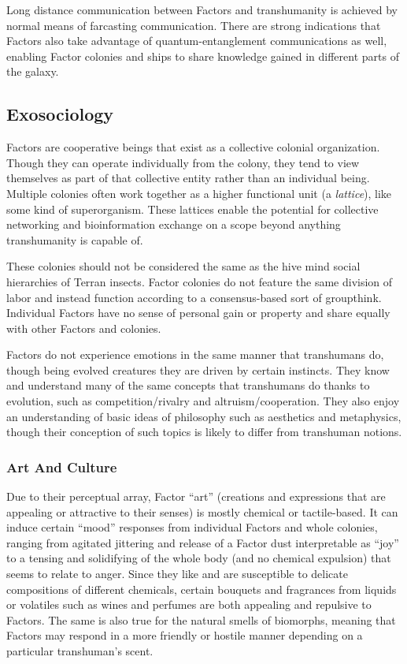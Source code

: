 Long distance communication between Factors and transhumanity is achieved by normal means of farcasting communication. There are strong indications that Factors also take advantage of quantum-entanglement communications as well, enabling Factor colonies and ships to share knowledge gained in different parts of the galaxy. 

\subsection{Exosociology} 

Factors are cooperative beings that exist as a collective colonial organization. Though they can operate individually from the colony, they tend to view themselves as part of that collective entity rather than an individual being. Multiple colonies often work together as a higher functional unit (a \textit{lattice}), like some kind of superorganism. These lattices enable the potential for collective networking and bioinformation exchange on a scope beyond anything transhumanity is capable of. 

These colonies should not be considered the same as the hive mind social hierarchies of Terran insects. Factor colonies do not feature the same division of labor and instead function according to a consensus-based sort of groupthink. Individual Factors have no sense of personal gain or property and share equally with other Factors and colonies. 



Factors do not experience emotions in the same manner that transhumans do, though being evolved creatures they are driven by certain instincts. They know and understand many of the same concepts that transhumans do thanks to evolution, such as competition/rivalry and altruism/cooperation. They also enjoy an understanding of basic ideas of philosophy such as aesthetics and metaphysics, though their conception of such topics is likely to differ from transhuman notions. 

\subsubsection{Art And Culture } 

Due to their perceptual array, Factor ``art'' (creations and expressions that are appealing or attractive to their senses) is mostly chemical or tactile-based. It can induce certain ``mood'' responses from individual Factors and whole colonies, ranging from agitated jittering and release of a Factor dust interpretable as ``joy'' to a tensing and solidifying of the whole body (and no chemical expulsion) that seems to relate to anger. Since they like and are susceptible to delicate compositions of different chemicals, certain bouquets and fragrances from liquids or volatiles such as wines and perfumes are both appealing and repulsive to Factors. The same is also true for the natural smells of biomorphs, meaning that Factors may respond in a more friendly or hostile manner depending on a particular transhuman's scent. 

